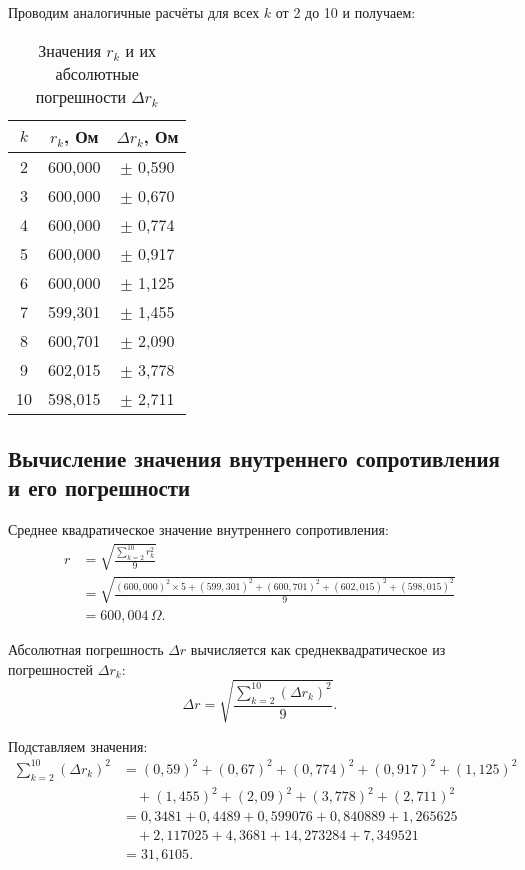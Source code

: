 Проводим аналогичные расчёты для всех \( k \) от 2 до 10 и получаем:

\begin{table}[H]
	\centering
	\caption*{Значения \( r_k \) и их абсолютные погрешности \( \Delta r_k \)}
	\begin{tabular}{|c|c|c|}
		\hline
		\( k \) & \( r_k \), Ом & \( \Delta r_k \), Ом \\
		\hline
		2       & 600{,}000     & \( \pm \) 0{,}590    \\
		3       & 600{,}000     & \( \pm \) 0{,}670    \\
		4       & 600{,}000     & \( \pm \) 0{,}774    \\
		5       & 600{,}000     & \( \pm \) 0{,}917    \\
		6       & 600{,}000     & \( \pm \) 1{,}125    \\
		7       & 599{,}301     & \( \pm \) 1{,}455    \\
		8       & 600{,}701     & \( \pm \) 2{,}090    \\
		9       & 602{,}015     & \( \pm \) 3{,}778    \\
		10      & 598{,}015     & \( \pm \) 2{,}711    \\
		\hline
	\end{tabular}
\end{table}

\subsection{Вычисление значения внутреннего сопротивления и его погрешности}

Среднее квадратическое значение внутреннего сопротивления:
\[
	\begin{aligned}
		r & = \sqrt{\frac{\sum\limits_{k=2}^{10} r_k^2}{9}}                                                           \\
		  & = \sqrt{\frac{(600{,}000)^2 \times 5 + (599{,}301)^2 + (600{,}701)^2 + (602{,}015)^2 + (598{,}015)^2}{9}} \\
		  & = 600{,}004\,\Omega.
	\end{aligned}
\]

Абсолютная погрешность \( \Delta r \) вычисляется как среднеквадратическое из погрешностей \( \Delta r_k \):
\[
	\Delta r = \sqrt{\frac{\sum_{k=2}^{10} (\Delta r_k)^2}{9}}.
\]

Подставляем значения:
\[
	\begin{aligned}
		\sum_{k=2}^{10} (\Delta r_k)^2 & = (0{,}59)^2 + (0{,}67)^2 + (0{,}774)^2 + (0{,}917)^2 + (1{,}125)^2 \\
		                               & \quad + (1{,}455)^2 + (2{,}09)^2 + (3{,}778)^2 + (2{,}711)^2        \\
		                               & = 0{,}3481 + 0{,}4489 + 0{,}599076 + 0{,}840889 + 1{,}265625        \\
		                               & \quad + 2{,}117025 + 4{,}3681 + 14{,}273284 + 7{,}349521            \\
		                               & = 31{,}6105.
	\end{aligned}
\]

